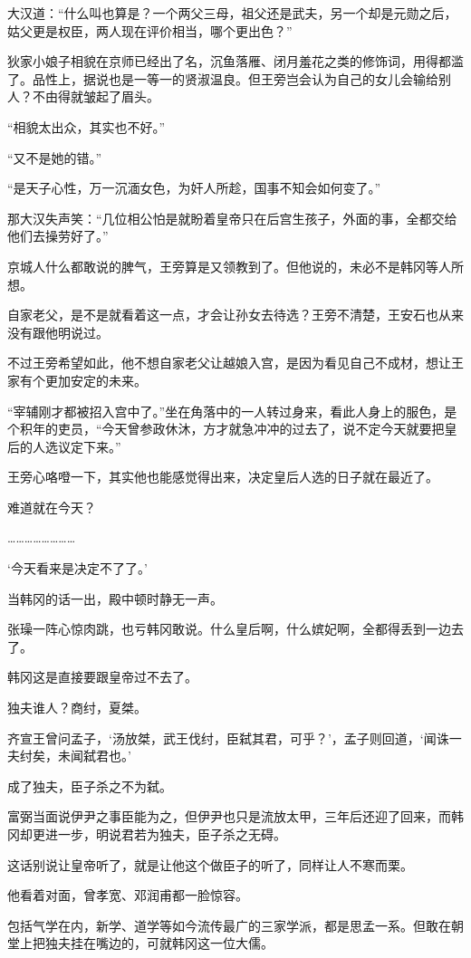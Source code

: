 大汉道：“什么叫也算是？一个两父三母，祖父还是武夫，另一个却是元勋之后，姑父更是权臣，两人现在评价相当，哪个更出色？”

狄家小娘子相貌在京师已经出了名，沉鱼落雁、闭月羞花之类的修饰词，用得都滥了。品性上，据说也是一等一的贤淑温良。但王旁岂会认为自己的女儿会输给别人？不由得就皱起了眉头。

“相貌太出众，其实也不好。”

“又不是她的错。”

“是天子心性，万一沉湎女色，为奸人所趁，国事不知会如何变了。”

那大汉失声笑：“几位相公怕是就盼着皇帝只在后宫生孩子，外面的事，全都交给他们去操劳好了。”

京城人什么都敢说的脾气，王旁算是又领教到了。但他说的，未必不是韩冈等人所想。

自家老父，是不是就看着这一点，才会让孙女去待选？王旁不清楚，王安石也从来没有跟他明说过。

不过王旁希望如此，他不想自家老父让越娘入宫，是因为看见自己不成材，想让王家有个更加安定的未来。

“宰辅刚才都被招入宫中了。”坐在角落中的一人转过身来，看此人身上的服色，是个积年的吏员，“今天曾参政休沐，方才就急冲冲的过去了，说不定今天就要把皇后的人选议定下来。”

王旁心咯噔一下，其实他也能感觉得出来，决定皇后人选的日子就在最近了。

难道就在今天？

……………………

‘今天看来是决定不了了。’

当韩冈的话一出，殿中顿时静无一声。

张璪一阵心惊肉跳，也亏韩冈敢说。什么皇后啊，什么嫔妃啊，全都得丢到一边去了。

韩冈这是直接要跟皇帝过不去了。

独夫谁人？商纣，夏桀。

齐宣王曾问孟子，‘汤放桀，武王伐纣，臣弑其君，可乎？’，孟子则回道，‘闻诛一夫纣矣，未闻弑君也。’

成了独夫，臣子杀之不为弑。

富弼当面说伊尹之事臣能为之，但伊尹也只是流放太甲，三年后还迎了回来，而韩冈却更进一步，明说君若为独夫，臣子杀之无碍。

这话别说让皇帝听了，就是让他这个做臣子的听了，同样让人不寒而栗。

他看着对面，曾孝宽、邓润甫都一脸惊容。

包括气学在内，新学、道学等如今流传最广的三家学派，都是思孟一系。但敢在朝堂上把独夫挂在嘴边的，可就韩冈这一位大儒。

